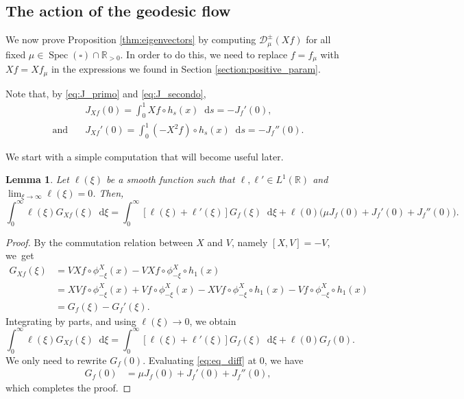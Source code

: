 \documentclass[10pt]{amsart}
\newcommand \R{\mathbb{R}}
\newcommand*{\diff}{\mathop{}\!\mathrm{d}}
\newcommand{\Dpmp}[1]{\mathcal{D}_\mu^{\pm}(#1)}
\DeclareMathOperator{\Spec}{Spec}
\newtheorem {lemma}[theorem]{Lemma}
\theoremstyle{definition}
\begin{document}
\subsection{The action of the geodesic flow}\label{section:geo_action}

We now prove Proposition \ref{thm:eigenvectors} by computing $\Dpmp{Xf}$ for all fixed $\mu \in \Spec(\square) \cap \R_{>0}$.
In order to do this, we need to replace $f=f_\mu$ with $Xf= Xf_\mu$ in the expressions we found in Section \ref{section:positive_param}.

Note that, by \eqref{eq:J_primo} and \eqref{eq:J_secondo},
\begin{equation}\label{eq:JX}
\begin{split}
&J_{Xf}(0) = \int_0^1 Xf \circ h_s(x) \diff s = -J_f'(0),\\
\text{and}\quad &J_{Xf}'(0)= \int_0^1 (-X^2f) \circ h_s(x) \diff s =- J_f''(0).
\end{split}
\end{equation}

We start with a simple computation that will become useful later.
\begin{lemma}\label{lemma:aGx}
Let $\ell(\xi)$ be a smooth function such that $\ell, \ell' \!\!\in\! L^1(\R)$ and \hbox{$\lim_{\xi \to \infty}\!\ell(\xi)\!=\!0$}. Then,
\[
\int_0^\infty \ell(\xi) G_{Xf}(\xi) \diff \xi = \int_0^\infty [\ell(\xi)+\ell'(\xi)] G_f(\xi) \diff \xi + \ell(0)\bigl(\mu J_f(0) + J_f'(0) + J_f''(0) \bigr).
\]
\end{lemma}
\begin{proof}
By the commutation relation between $X$ and $V$, namely $[X,V]=-V$, we~get
\begin{equation*}
\begin{split}
G_{Xf}(\xi) &= VXf \circ \phi^X_{-\xi}(x) - VXf \circ \phi^X_{-\xi} \circ h_1(x) \\
&= XVf \circ \phi^X_{-\xi}(x) +Vf \circ \phi^X_{-\xi}(x) - XVf \circ \phi^X_{-\xi} \circ h_1(x) -Vf \circ \phi^X_{-\xi} \circ h_1(x) \\
&= G_f(\xi) - G_f'(\xi).
\end{split}
\end{equation*}
Integrating by parts, and using $\ell(\xi) \to 0$, we obtain
\[
\int_0^\infty \ell(\xi) G_{Xf}(\xi) \diff \xi = \int_0^\infty [\ell(\xi)+\ell'(\xi)] G_f(\xi) \diff \xi + \ell(0)G_f(0).
\]
We only need to rewrite $G_f(0)$. Evaluating \eqref{eq:eq_diff} at $0$, we have
\begin{equation*}
\begin{split}
G_f(0) &=\mu J_f(0) + J_f'(0) + J_f''(0),
\end{split}
\end{equation*}
which completes the proof.
\end{proof}
\end{document}
